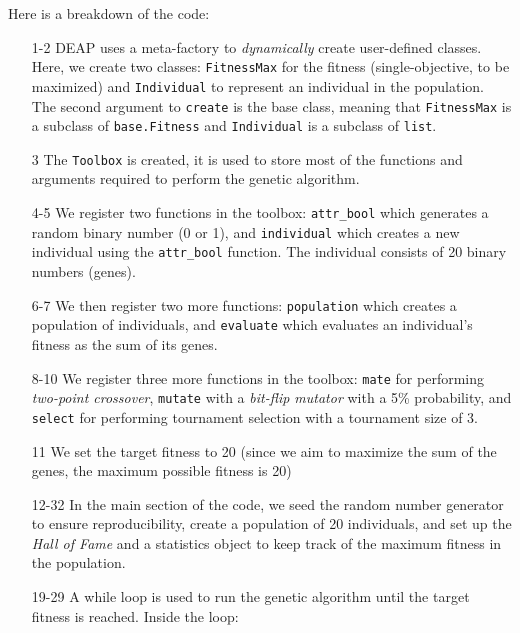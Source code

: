   Here is a breakdown of the code:

  \begin{enumerate}
    \item[1-2] DEAP uses a meta-factory to \textit{dynamically} create
      user-defined classes.
      Here, we create two classes: \texttt{FitnessMax} for the fitness
      (single-objective, to be maximized) and \texttt{Individual} to represent
      an individual in the population.
      The second argument to \texttt{create} is the base class, meaning that
      \texttt{FitnessMax} is a subclass of \texttt{base.Fitness} and
      \texttt{Individual} is a subclass of \texttt{list}.
    \item[3] The \texttt{Toolbox} is created, it is used to store most of the
      functions and arguments required to perform the genetic algorithm.
    \item[4-5] We register two functions in the toolbox: \texttt{attr\_bool} 
      which generates a random binary number (0 or 1), and \texttt{individual}
      which creates a new individual using the \texttt{attr\_bool} function.
      The individual consists of 20 binary numbers (genes).
    \item[6-7] We then register two more functions: \texttt{population} which
      creates a population of individuals, and \texttt{evaluate} which evaluates
      an individual's fitness as the sum of its genes.
    \item[8-10] We register three more functions in the toolbox: \texttt{mate}
      for performing \textit{two-point crossover}, \texttt{mutate} with a
      \textit{bit-flip mutator} with a 5\% probability, and \texttt{select}
      for performing tournament selection with a tournament size of 3.
    \item[11] We set the target fitness to 20 (since we aim to maximize the sum
      of the genes, the maximum possible fitness is 20) 
    \item[12-32] In the main section of the code, we seed the random number
      generator to ensure reproducibility, create a population of 20
      individuals, and set up the \textit{Hall of Fame} and a statistics object
      to keep track of the maximum fitness in the population.
    \item[19-29] A while loop is used to run the genetic algorithm until the
      target fitness is reached.
      Inside the loop:


\end{enumerate}
